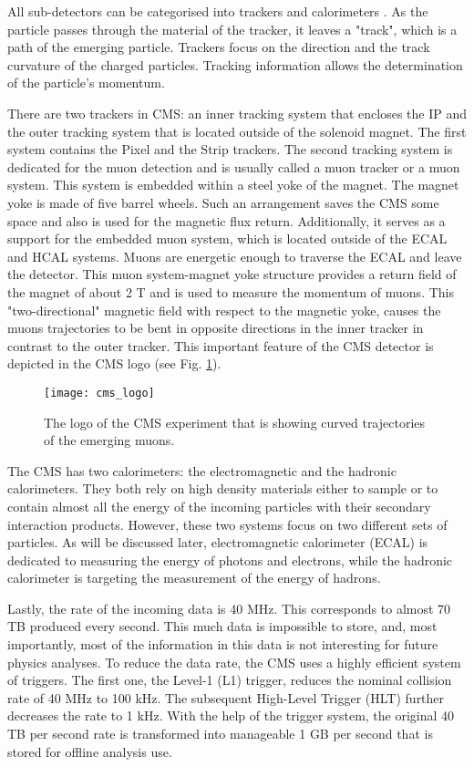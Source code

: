 \begin{normalsize}
All sub-detectors can be categorised into trackers and calorimeters \cite{Hauptman:2011zza}. As the particle passes through the material of the tracker, it leaves a "track", which is a path of the emerging particle. Trackers focus on the direction and the track curvature of the charged particles. Tracking information allows the determination of the particle's momentum. 

There are two trackers in CMS: an inner tracking system that encloses the IP and the outer tracking system that is located outside of the solenoid magnet. The first system contains the Pixel and the Strip trackers. The second tracking system is dedicated for the muon detection and is usually called a muon tracker or a muon system. This system is embedded within a steel yoke of the magnet. The magnet yoke is made of five barrel wheels. Such an arrangement saves the CMS some space and also is used for the magnetic flux return. Additionally, it serves as a support for the embedded muon system, which is located outside of the ECAL and HCAL systems. Muons are energetic enough to traverse the ECAL and leave the detector. This muon system-magnet yoke structure provides a return field of the magnet of about 2 T and is used to measure the momentum of muons. This "two-directional" magnetic field with respect to the magnetic yoke, causes the muons trajectories to be bent in opposite directions in the inner tracker in contrast to the outer tracker. This important feature of the CMS detector is depicted in the CMS logo (see Fig. \ref{cms_logo}). 

\begin{figure}[H]
  \centering
  \texttt{[image: cms\_logo]}
  \caption{The logo of the CMS experiment that is showing curved trajectories of the emerging muons.}
  \label{cms_logo}
\end{figure}


The CMS has two calorimeters: the electromagnetic and the hadronic calorimeters. They both rely on high density materials either to sample or to contain almost all the energy of the incoming particles with their secondary interaction products. However, these two systems focus on two different sets of particles. As will be discussed later, electromagnetic calorimeter (ECAL) is dedicated to measuring the energy of photons and electrons, while the hadronic calorimeter is targeting the measurement of the energy of hadrons.

Lastly, the rate of the incoming data is 40 MHz. This corresponds to almost 70 TB produced every second. This much data is impossible to store, and, most importantly, most of the information in this data is not interesting for future physics analyses. To reduce the data rate, the CMS uses a highly efficient system of triggers. The first one, the Level-1 (L1) trigger, reduces the nominal collision rate of 40 MHz to 100 kHz. The subsequent High-Level Trigger (HLT) further decreases the rate to 1 kHz. With the help of the trigger system, the original 40 TB per second rate is transformed into manageable 1 GB per second that is stored for offline analysis use. 


\end{normalsize}
